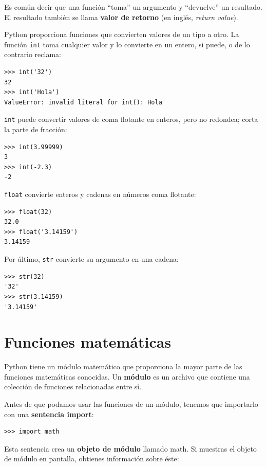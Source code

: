 \documentclass[10pt]{book}
\begin{document}
Es común decir que una función ``toma'' un argumento y ``devuelve''
un resultado.  El resultado también se llama {\bf valor de retorno} (en inglés, {\em return value}).

Python proporciona funciones que convierten valores
de un tipo a otro.  La función {\tt int} toma cualquier valor y
lo convierte en un entero, si puede, o de lo contrario reclama:

\begin{verbatim}
>>> int('32')
32
>>> int('Hola')
ValueError: invalid literal for int(): Hola
\end{verbatim}
%
{\tt int} puede convertir valores de coma flotante en enteros, pero
no redondea; corta la parte de fracción:

\begin{verbatim}
>>> int(3.99999)
3
>>> int(-2.3)
-2
\end{verbatim}
%
{\tt float} convierte enteros y cadenas en números coma
flotante:

\begin{verbatim}
>>> float(32)
32.0
>>> float('3.14159')
3.14159
\end{verbatim}
%
Por último, {\tt str} convierte su argumento en una cadena:

\begin{verbatim}
>>> str(32)
'32'
>>> str(3.14159)
'3.14159'
\end{verbatim}
%

\section{Funciones matemáticas}

Python tiene un módulo matemático que proporciona la mayor parte de las
funciones matemáticas conocidas.  Un {\bf módulo} es un archivo que contiene una
colección de funciones relacionadas entre sí.

Antes de que podamos usar las funciones de un módulo, tenemos que importarlo con
una {\bf sentencia import}:

\begin{verbatim}
>>> import math
\end{verbatim}
%
Esta sentencia crea un {\bf objeto de módulo} llamado math.  Si
muestras el objeto de módulo en pantalla, obtienes información sobre éste:
\end{document}
